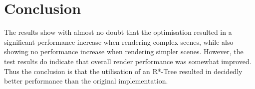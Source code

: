 \documentclass[a4paper]{article}
\begin{document}
\section{Conclusion}

The results show with almost no doubt that the optimisation resulted in a significant performance increase when rendering complex scenes, while also showing no performance increase when rendering simpler scenes. However, the test results do indicate that overall render performance was somewhat improved. Thus the conclusion is that the utilisation of an R*-Tree resulted in decidedly better performance than the original implementation.
\end{document}
